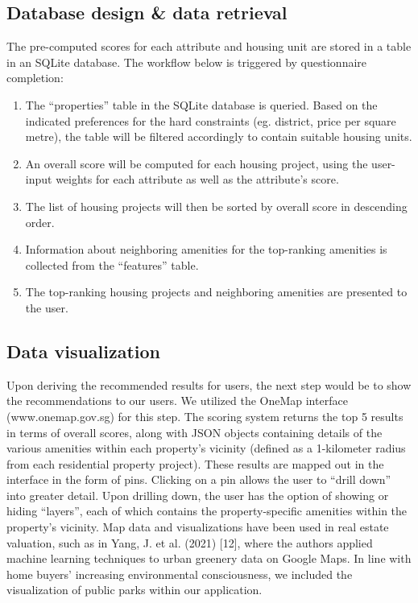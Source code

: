\documentclass[a4paper, 11pt]{article}
\begin{document}
\subsection{Database design \& data retrieval}

The pre-computed scores for each attribute and housing unit are stored in a table in an SQLite database. The workflow below is triggered by questionnaire completion:

\begin{enumerate}
    \item The “properties” table in the SQLite database is queried. Based on the indicated preferences for the hard constraints (eg. district, price per square metre), the table will be filtered accordingly to contain suitable housing units.
    \item An overall score will be computed for each housing project, using the user-input weights for each attribute as well as the attribute’s score.
    \item The list of housing projects will then be sorted by overall score in descending order.
    \item Information about neighboring amenities for the top-ranking amenities is collected from the “features” table.
    \item The top-ranking housing projects and neighboring amenities are presented to the user.
\end{enumerate}

\subsection{Data visualization}

Upon deriving the recommended results for users, the next step would be to show the recommendations to our users. We utilized the OneMap interface (www.onemap.gov.sg) for this step. The scoring system returns the top 5 results in terms of overall scores, along with JSON objects containing details of the various amenities within each property's vicinity (defined as a 1-kilometer radius from each residential property project). These results are mapped out in the interface in the form of pins. Clicking on a pin allows the user to “drill down” into greater detail. Upon drilling down, the user has the option of showing or hiding “layers”, each of which contains the property-specific amenities within the property's vicinity. Map data and visualizations have been used in real estate valuation, such as in Yang, J. et al. (2021) [12], where the authors applied machine learning techniques to urban greenery data on Google Maps. In line with home buyers’ increasing environmental consciousness, we included the visualization of public parks within our application.
\end{document}
